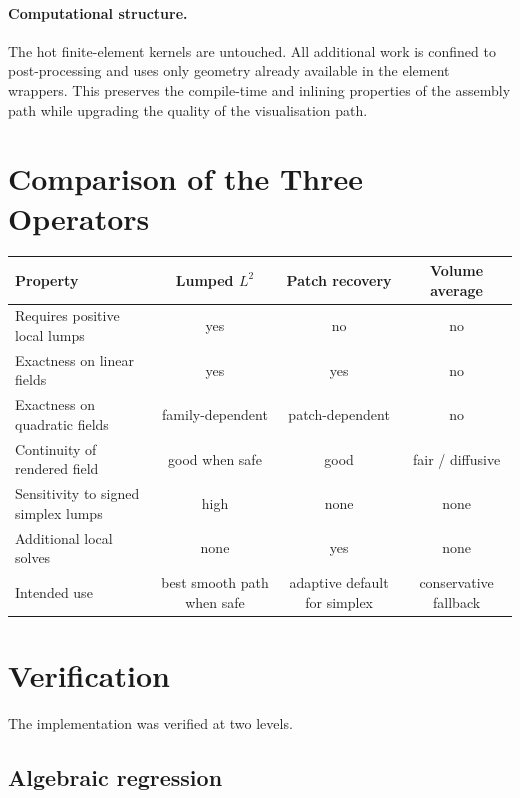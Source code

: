 \paragraph{Computational structure.}
The hot finite-element kernels are untouched.  All additional work is confined
to post-processing and uses only geometry already available in the element
wrappers.  This preserves the compile-time and inlining properties of the
assembly path while upgrading the quality of the visualisation path.


\section{Comparison of the Three Operators}
\label{sec:projection_comparison}

\begin{center}
\renewcommand{\arraystretch}{1.2}
\begin{tabular}{p{4.0cm}ccc}
  \toprule
  Property & Lumped $L^2$ & Patch recovery & Volume average \\
  \midrule
  Requires positive local lumps & yes & no & no \\
  Exactness on linear fields & yes & yes & no \\
  Exactness on quadratic fields & family-dependent & patch-dependent & no \\
  Continuity of rendered field & good when safe & good & fair / diffusive \\
  Sensitivity to signed simplex lumps & high & none & none \\
  Additional local solves & none & yes & none \\
  Intended use & best smooth path when safe & adaptive default for simplex & conservative fallback \\
  \bottomrule
\end{tabular}
\end{center}


\section{Verification}
\label{sec:projection_verification}

The implementation was verified at two levels.

\subsection{Algebraic regression}

